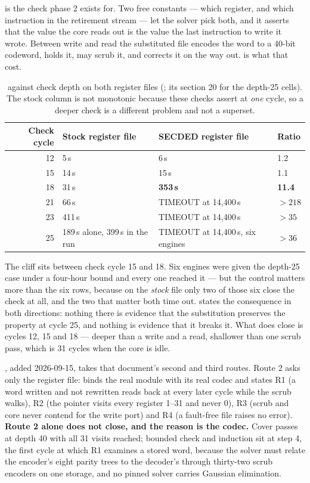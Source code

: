  is the check phase 2 exists for. Two free constants --- which register, and which instruction in the retirement stream --- let the solver pick both, and it asserts that the value the core reads out is the value the last instruction to write it wrote. Between write and read the substituted file encodes the word to a 40-bit codeword, holds it, may scrub it, and corrects it on the way out.  is what that cost.

\begin{table}[tbp]
\centering
\caption{ against check depth on both register files (; its section 20 for the depth-25 cells). The stock column is not monotonic because these checks assert at \emph{one} cycle, so a deeper check is a different problem and not a superset.}
\label{tab:verif-regch0}
\small
\begin{tabular}{@{}rlll@{}}
\toprule
Check cycle & Stock register file & SECDED register file & Ratio \\
\midrule
12 & 5\,s   & 6\,s                       & 1.2 \\
15 & 14\,s  & 15\,s                      & 1.1 \\
18 & 31\,s  & \textbf{353\,s}            & \textbf{11.4} \\
21 & 66\,s  & TIMEOUT at 14{,}400\,s     & $>218$ \\
23 & 411\,s & TIMEOUT at 14{,}400\,s     & $>35$ \\
25 & 189\,s alone, 399\,s in the run & TIMEOUT at 14{,}400\,s, six engines & $>36$ \\
\bottomrule
\end{tabular}
\end{table}

The cliff sits between check cycle 15 and 18. Six engines were given the
depth-25 case under a four-hour bound and every one reached it --- but
the control matters more than the six rows, because on the \emph{stock}
file only two of those six close the check at all, and the two that
matter both time out.  states the consequence in
both directions: nothing there is evidence that the substitution
preserves the property at cycle 25, and nothing is evidence that it
breaks it. What does close is cycles 12, 15 and 18 --- deeper than a
write and a read, shallower than one scrub pass, which is 31 cycles when
the core is idle.

, added 2026-09-15, takes that document's second and third routes. Route 2 asks only the register file:  binds the real module with its real codec and states R1 (a word written and not rewritten reads back at every later cycle while the scrub walks), R2 (the pointer visits every register 1--31 and never 0), R3 (scrub and core never contend for the write port) and R4 (a fault-free file raises no error). \textbf{Route 2 alone does not close, and the reason is the codec.} Cover passes at depth 40 with all 31 visits reached; bounded check and induction sit at step 4, the first cycle at which R1 examines a stored word, because the solver must relate the encoder's eight parity trees to the decoder's through thirty-two scrub encoders on one storage, and no pinned solver carries Gaussian elimination.

